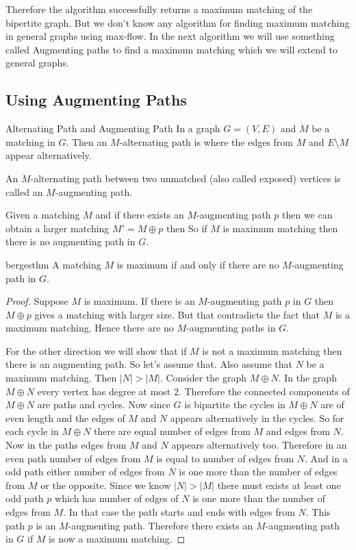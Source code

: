 Therefore the algorithm successfully returns a maximum matching of the bipertite graph. But we don't know any algorithm for finding maximum matching in general graphs using max-flow. In the next algorithm we will use something called Augmenting paths to find a maximum matching which we will extend to general graphs.
\subsection{Using Augmenting Paths}\label{section:bp-augment-path}
\begin{Definition}{Alternating Path and Augmenting Path}{}
	In a graph $G=(V,E)$ and $M$ be a matching in $G$. Then an $M$-alternating path is where the edges from $M$ and $E\setminus M$ appear alternatively.\parinn
	
	An $M$-alternating path between two unmatched (also called exposed) vertices is called an $M$-augmenting path. 
\end{Definition}

Given a matching $M$ and if there exists an $M$-augmenting path $p$ then we can obtain a larger matching $M'=M\oplus p$ then  So if $M$ is maximum matching then there is no augmenting path in $G$.
\begin{Theorem}{}{bergesthm}
	A matching $M$ is maximum if and only if there are no $M$-augmenting path in $G$.
\end{Theorem}
\begin{proof}
	Suppose $M$ is maximum. If there is an $M$-augmenting path $p$ in $G$ then $M\oplus p$  gives a matching with larger size. But that contradicts the fact that $M$ is a maximum matching. Hence there are no $M$-augmenting paths in $G$.
	
	For the other direction we will show that if $M$ is not a maximum matching then there is an augmenting path. So let's assume that. Also assume that $N$ be a maximum matching. Then $|N|>|M|$. Consider the graph $M\oplus N$. In the graph $M\oplus N$ every vertex has degree at most 2. Therefore the connected components of $M\oplus N$ are paths and cycles. Now since $G$ is bipartite the cycles in $M\oplus N$ are of even length and the edges of $M$ and $N$ appears alternatively in the cycles. So for each cycle in $M\oplus N$ there are equal number of edges from $M$ and edges from $N$. Now in the paths edges from $M$ and $N$ appears alternatively  too. Therefore in an even path number of edges from $M$ is equal to number of edges from $N$. And in a odd path either number of edges from $N$ is one more than the number of edges from $M$ or the opposite. Since we know $|N|>|M|$ there must exists at least one odd path $p$ which has number of edges of $N$ is one more than the number of edges from $M$. In that case the path starts and ends with edges from $N$. This path $p$ is an $M$-augmenting path. Therefore there exists an $M$-augmenting path in $G$ if $M$ is now a maximum matching. 
\end{proof}


